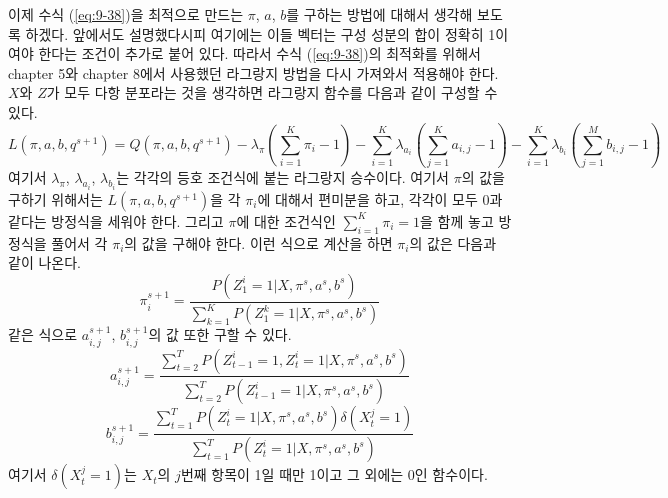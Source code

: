 \documentclass[a4paper]{oblivoir}
\begin{document}
이제 수식 (\ref{eq:9-38})을 최적으로 만드는 $\pi$, $a$, $b$를 구하는 방법에 대해서 생각해 보도록 하겠다. 앞에서도 설명했다시피 여기에는 이들 벡터는 구성 성분의 합이 정확히 1이여야 한다는 조건이 추가로 붙어 있다. 따라서 수식 (\ref{eq:9-38})의 최적화를 위해서 chapter 5와 chapter 8에서 사용했던 라그랑지 방법을 다시 가져와서 적용해야 한다. $X$와 $Z$가 모두 다항 분포라는 것을 생각하면 라그랑지 함수를 다음과 같이 구성할 수 있다.
\begin{equation}
L(\pi, a, b, q^{s+1}) = Q(\pi, a, b, q^{s+1}) - \lambda_{\pi} (\sum_{i=1}^{K} \pi_i - 1) - \sum_{i=1}^{K} \lambda_{a_i} ( \sum_{j=1}^{K} a_{i,j} - 1) - \sum_{i=1}^{K} \lambda_{b_i} ( \sum_{j=1}^{M} b_{i,j} - 1)
\label{eq:9-39}
\end{equation} 
여기서 $\lambda_{\pi}$, $\lambda_{a_i}$, $\lambda_{b_i}$는 각각의 등호 조건식에 붙는 라그랑지 승수이다. 여기서 $\pi$의 값을 구하기 위해서는 $L(\pi, a, b, q^{s+1})$을 각 $\pi_i$에 대해서 편미분을 하고, 각각이 모두 0과 같다는 방정식을 세워야 한다. 그리고 $\pi$에 대한 조건식인 $\sum_{i=1}^{K} \pi_i = 1$을 함께 놓고 방정식을 풀어서 각 $\pi_{i}$의 값을 구해야 한다. 이런 식으로 계산을 하면 $\pi_{i}$의 값은 다음과 같이 나온다. 
\begin{equation}
\pi_{i}^{s+1} = \frac{P(Z_1^{i}=1 | X, \pi^{s}, a^{s}, b^{s})}{\sum_{k=1}^{K} P(Z_1^{k}=1 | X, \pi^{s}, a^{s}, b^{s})}
\label{eq:9-43}
\end{equation} 
같은 식으로 $a_{i,j}^{s+1}$, $b_{i,j}^{s+1}$의 값 또한 구할 수 있다. 
\begin{equation}
a_{i,j}^{s+1} = \frac{\sum_{t=2}^{T} P(Z_{t-1}^{i}=1, Z_{t}^{i}=1 | X, \pi^{s}, a^{s}, b^{s})}{\sum_{t=2}^{T} P(Z_{t-1}^{i}=1 | X, \pi^{s}, a^{s}, b^{s})}
\label{eq:9-44}
\end{equation} 
\begin{equation}
b_{i,j}^{s+1} = \frac{\sum_{t=1}^{T} P(Z_{t}^{i}=1 | X, \pi^{s}, a^{s}, b^{s}) \delta(X_{t}^{j}=1)}{\sum_{t=1}^{T} P(Z_{t}^{i}=1 | X, \pi^{s}, a^{s}, b^{s})}
\label{eq:9-45}
\end{equation} 
여기서 $\delta(X_{t}^{j}=1)$는 $X_{t}$의 $j$번째 항목이 1일 때만 1이고 그 외에는 0인 함수이다. \\ 
\end{document}
